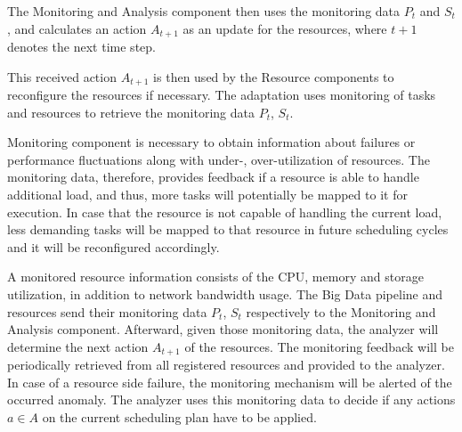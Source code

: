   The Monitoring and Analysis component then uses the monitoring data $P_t$ and $S_t$, and calculates an action $A_{t+1}$ as an update for the resources, where $t+1$ denotes the next time step.
  
  This received action $A_{t+1}$ is then used by the Resource components to reconfigure the resources if necessary.
  The adaptation uses monitoring of tasks and resources to retrieve the monitoring data $P_t$, $S_t$.
  
  Monitoring component is necessary to obtain information about failures or performance fluctuations along with under-, over-utilization of resources.
  The monitoring data, therefore, provides feedback if a resource is able to handle additional load, and thus, more tasks will potentially be mapped to it for execution. 
  In case that the resource is not capable of handling the current load, less demanding tasks will be mapped to that resource in future scheduling cycles and it will be reconfigured accordingly.

  A monitored resource information consists of the CPU, memory and storage utilization, in addition to network bandwidth usage.
  The Big Data pipeline and resources send their monitoring data $P_t$, $S_t$ respectively to the Monitoring and Analysis component.
  Afterward, given those monitoring data, the analyzer will determine the next action $A_{t+1}$ of the resources.
  The monitoring feedback will be periodically retrieved from all registered resources and provided to the analyzer.
  In case of a resource side failure, the monitoring mechanism will be alerted of the occurred anomaly.  
  The analyzer uses this monitoring data to decide if any actions $a \in A$ on the current scheduling plan have to be applied.
  

